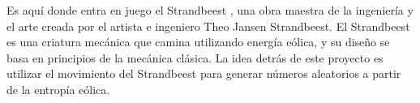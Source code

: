 \documentclass{article}
\begin{document}
Es aquí donde entra en juego el Strandbeest \cite{strandbeest2024}, una obra maestra de la ingeniería y el arte creada por el artista e ingeniero Theo Jansen Strandbeest. El Strandbeest es una criatura mecánica que camina utilizando energía eólica, y su diseño se basa en principios de la mecánica clásica. La idea detrás de este proyecto es utilizar el movimiento del Strandbeest para generar números aleatorios a partir de la entropía eólica.

\vspace*{\fill}

\newpage



\newpage

\end{document}

